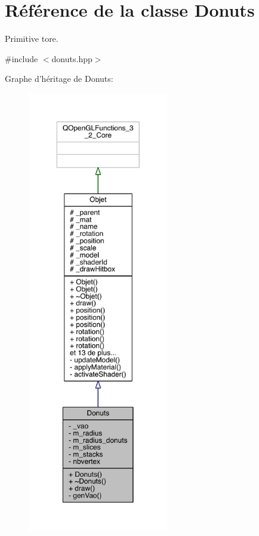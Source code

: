 \hypertarget{class_donuts}{\section{Référence de la classe Donuts}
\label{class_donuts}
}


Primitive tore.  




{\ttfamily \#include $<$donuts.\+hpp$>$}



Graphe d'héritage de Donuts\+:
\nopagebreak
\begin{figure}[H]
\begin{center}
\leavevmode
\includegraphics[height=550pt]{class_donuts__inherit__graph}
\end{center}
\end{figure}


